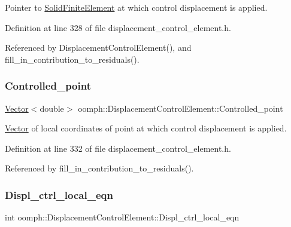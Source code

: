 Pointer to \hyperlink{classoomph_1_1SolidFiniteElement}{Solid\+Finite\+Element} at which control displacement is applied. 



Definition at line 328 of file displacement\+\_\+control\+\_\+element.\+h.



Referenced by Displacement\+Control\+Element(), and fill\+\_\+in\+\_\+contribution\+\_\+to\+\_\+residuals().

\mbox{\label{classoomph_1_1DisplacementControlElement_a7360dc9bd9b6752a060d04dcbe104186}} 
\subsubsection{\texorpdfstring{Controlled\+\_\+point}{Controlled\_point}}
{\footnotesize\ttfamily \hyperlink{classoomph_1_1Vector}{Vector}$<$double$>$ oomph\+::\+Displacement\+Control\+Element\+::\+Controlled\+\_\+point\hspace{0.3cm}{\ttfamily [protected]}}



\hyperlink{classoomph_1_1Vector}{Vector} of local coordinates of point at which control displacement is applied. 



Definition at line 332 of file displacement\+\_\+control\+\_\+element.\+h.



Referenced by fill\+\_\+in\+\_\+contribution\+\_\+to\+\_\+residuals().

\mbox{\label{classoomph_1_1DisplacementControlElement_af9df9b436aa9bffa964618f319cbd9ed}} 
\subsubsection{\texorpdfstring{Displ\+\_\+ctrl\+\_\+local\+\_\+eqn}{Displ\_ctrl\_local\_eqn}}
{\footnotesize\ttfamily int oomph\+::\+Displacement\+Control\+Element\+::\+Displ\+\_\+ctrl\+\_\+local\+\_\+eqn\hspace{0.3cm}{\ttfamily [protected]}}



